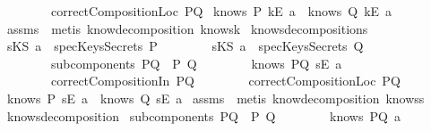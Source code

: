 \begin{isabellebody}
\ \ \ \ \ \ \ \ {\isachardoublequoteopen}correctCompositionLoc\ PQ{\isachardoublequoteclose}\isanewline
{}\ {\isachardoublequoteopen}knows\ P\ {\isacharbrackleft}kE\ a{\isacharbrackright}\ {\isasymor}\ knows\ Q\ {\isacharbrackleft}kE\ a{\isacharbrackright}{\isachardoublequoteclose}\isanewline
\isadelimproof
\endisadelimproof
\isatagproof
{}\isamarkupfalse \ assms\ \isamarkupfalse \ {\isacharparenleft}metis\ know{\isacharunderscore}decomposition\ knows{}k{\isacharparenright}\endisatagproof
{\isafoldproof}\isadelimproof
\isanewline
\endisadelimproof
\isanewline
{}\isamarkupfalse \ knows{\isacharunderscore}decomposition{\isacharunderscore}{}{\isacharunderscore}s{\isacharcolon}\isanewline
{}\ {\isachardoublequoteopen}sKS\ a\ {\isasymnotin}\ specKeysSecrets\ P{\isachardoublequoteclose}\isanewline
\ \ \ \ \ \ \ \ {\isachardoublequoteopen}sKS\ a\ {\isasymnotin}\ specKeysSecrets\ Q{\isachardoublequoteclose}\isanewline
\ \ \ \ \ \ \ \ {\isachardoublequoteopen}subcomponents\ PQ\ {\isacharequal}\ {\isacharbraceleft}P{\isacharcomma}\ Q{\isacharbraceright}{\isachardoublequoteclose}\isanewline
\ \ \ \ \ \ \ \ {\isachardoublequoteopen}knows\ PQ\ {\isacharbrackleft}sE\ a{\isacharbrackright}{\isachardoublequoteclose}\isanewline
\ \ \ \ \ \ \ \ {\isachardoublequoteopen}correctCompositionIn\ PQ{\isachardoublequoteclose}\isanewline
\ \ \ \ \ \ \ \ {\isachardoublequoteopen}correctCompositionLoc\ PQ{\isachardoublequoteclose}\isanewline
{}\ {\isachardoublequoteopen}knows\ P\ {\isacharbrackleft}sE\ a{\isacharbrackright}\ {\isasymor}\ knows\ Q\ {\isacharbrackleft}sE\ a{\isacharbrackright}{\isachardoublequoteclose}\isanewline
\isadelimproof
\endisadelimproof
\isatagproof
{}\isamarkupfalse \ assms\ \isamarkupfalse \ {\isacharparenleft}metis\ know{\isacharunderscore}decomposition\ knows{}s{\isacharparenright}\endisatagproof
{\isafoldproof}\isadelimproof
\isanewline
\endisadelimproof
\isanewline
{}\isamarkupfalse \ knows{\isacharunderscore}decomposition{\isacharunderscore}{}{\isacharcolon}\isanewline
{}\ {\isachardoublequoteopen}subcomponents\ PQ\ {\isacharequal}\ {\isacharbraceleft}P{\isacharcomma}\ Q{\isacharbraceright}{\isachardoublequoteclose}\isanewline
\ \ \ \ \ \ \ \ {\isachardoublequoteopen}knows\ PQ\ {\isacharbrackleft}a{\isacharbrackright}{\isachardoublequoteclose}\isanewline

\end{isabellebody}
